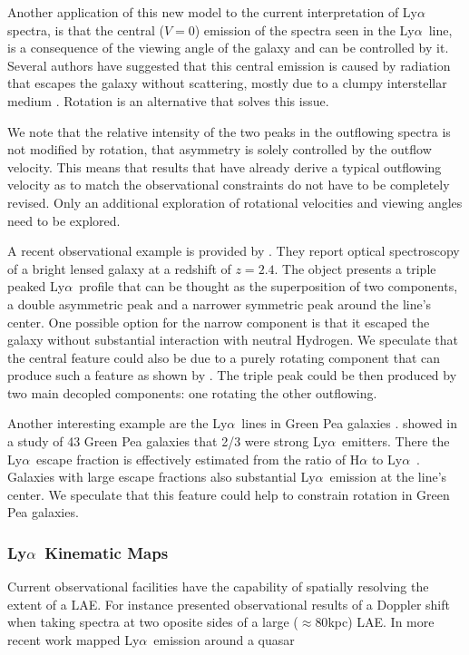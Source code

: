 \documentclass[a4paper,fleqn,usenatbib]{mnras}
\newcommand{\lya}{\ifmmode{{\rm Ly}\alpha}\else Ly$\alpha$\ \fi}
\begin{document}
Another application of this new model to the current interpretation of \lya
spectra, is that the central ($V=0$) emission of the spectra seen in the
\lya line, is a consequence of the viewing angle of the galaxy and can be
controlled by it. 
Several authors have suggested that this central emission is caused by
radiation that escapes the galaxy without scattering, mostly due to a
clumpy interstellar medium \citep{Hansen06, 2016ApJ...833L..26G}.
Rotation is an alternative that solves this issue. 

We note that the relative intensity of the two peaks in the outflowing
spectra is not modified by rotation, that asymmetry is solely
controlled by the outflow velocity.
This means that results that have already derive a typical outflowing
velocity as to match the observational constraints do not have to be
completely revised. 
Only an additional exploration of rotational velocities and viewing
angles need to be explored.

A recent observational example is provided by
\cite{2017A&A...608L...4R}.
They report optical spectroscopy of a bright lensed galaxy at a
redshift of $z=2.4$. 
The object presents a triple peaked \lya profile that can be thought
as the superposition of two components, a double asymmetric peak and a
narrower symmetric peak around the line's center.
One possible option for the narrow component is that it escaped the
galaxy without substantial interaction with neutral Hydrogen.
We speculate that the central feature could also be due to a purely 
rotating component that can produce such a feature as shown by
\cite{tololo}. The triple peak could be then produced by two main
decopled components: one rotating the other outflowing.

Another interesting example are the \lya lines in Green Pea galaxies \citep{2016ApJ...820..130Y}.
\cite{2017ApJ...844..171Y} showed in a study of 43 Green Pea galaxies
that 2/3 were strong \lya emitters. 
There the \lya escape fraction is effectively estimated from the ratio
of H$\alpha$ to \lya.
Galaxies with large escape fractions also substantial \lya emission at
the line's center. 
We speculate that this feature could help to constrain rotation in
Green Pea galaxies. 


\subsubsection{\lya Kinematic Maps}

Current observational facilities have the capability of spatially
resolving the extent of a LAE.
For instance \cite{Prescott14} presented observational results of a
Doppler shift when taking spectra at two oposite sides of a large
($\approx 80$kpc) LAE.
In more recent work \cite{2018MNRAS.473.3907A} mapped \lya emission
around a quasar 
\end{document}
